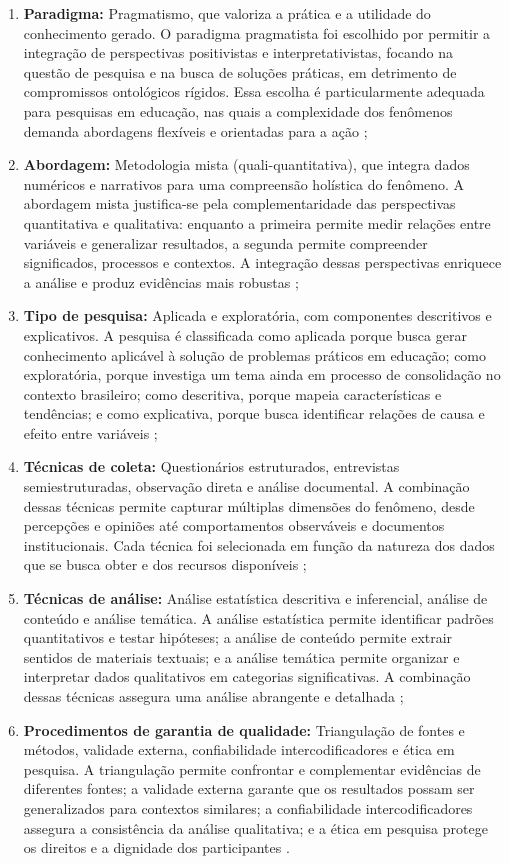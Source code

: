 \begin{enumerate}
    \item \textbf{Paradigma:} Pragmatismo, que valoriza a prática e a utilidade do conhecimento gerado. O paradigma pragmatista foi escolhido por permitir a integração de perspectivas positivistas e interpretativistas, focando na questão de pesquisa e na busca de soluções práticas, em detrimento de compromissos ontológicos rígidos. Essa escolha é particularmente adequada para pesquisas em educação, nas quais a complexidade dos fenômenos demanda abordagens flexíveis e orientadas para a ação \cite{CRESWELL2018};
    \item \textbf{Abordagem:} Metodologia mista (quali-quantitativa), que integra dados numéricos e narrativos para uma compreensão holística do fenômeno. A abordagem mista justifica-se pela complementaridade das perspectivas quantitativa e qualitativa: enquanto a primeira permite medir relações entre variáveis e generalizar resultados, a segunda permite compreender significados, processos e contextos. A integração dessas perspectivas enriquece a análise e produz evidências mais robustas \cite{CRESWELL2018};
    \item \textbf{Tipo de pesquisa:} Aplicada e exploratória, com componentes descritivos e explicativos. A pesquisa é classificada como aplicada porque busca gerar conhecimento aplicável à solução de problemas práticos em educação; como exploratória, porque investiga um tema ainda em processo de consolidação no contexto brasileiro; como descritiva, porque mapeia características e tendências; e como explicativa, porque busca identificar relações de causa e efeito entre variáveis \cite{SANTOS2024};
    \item \textbf{Técnicas de coleta:} Questionários estruturados, entrevistas semiestruturadas, observação direta e análise documental. A combinação dessas técnicas permite capturar múltiplas dimensões do fenômeno, desde percepções e opiniões até comportamentos observáveis e documentos institucionais. Cada técnica foi selecionada em função da natureza dos dados que se busca obter e dos recursos disponíveis \cite{BARDIN2016};
    \item \textbf{Técnicas de análise:} Análise estatística descritiva e inferencial, análise de conteúdo e análise temática. A análise estatística permite identificar padrões quantitativos e testar hipóteses; a análise de conteúdo permite extrair sentidos de materiais textuais; e a análise temática permite organizar e interpretar dados qualitativos em categorias significativas. A combinação dessas técnicas assegura uma análise abrangente e detalhada \cite{BARDIN2016};
    \item \textbf{Procedimentos de garantia de qualidade:} Triangulação de fontes e métodos, validade externa, confiabilidade intercodificadores e ética em pesquisa. A triangulação permite confrontar e complementar evidências de diferentes fontes; a validade externa garante que os resultados possam ser generalizados para contextos similares; a confiabilidade intercodificadores assegura a consistência da análise qualitativa; e a ética em pesquisa protege os direitos e a dignidade dos participantes \cite{CRESWELL2018}.
\end{enumerate}

